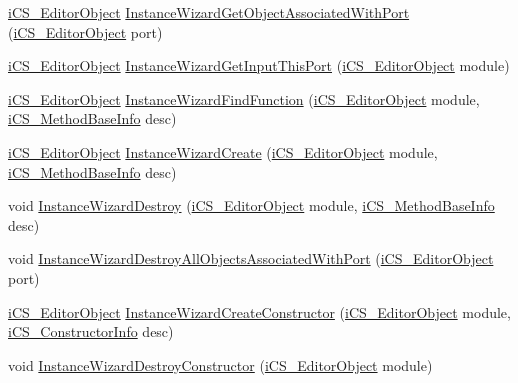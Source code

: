 \begin{DoxyCompactItemize}
\item 
\hyperlink{classi_c_s___editor_object}{i\+C\+S\+\_\+\+Editor\+Object} \hyperlink{classi_c_s___i_storage_a312bb4fcebd901bf72e88cab2eda09ed}{Instance\+Wizard\+Get\+Object\+Associated\+With\+Port} (\hyperlink{classi_c_s___editor_object}{i\+C\+S\+\_\+\+Editor\+Object} port)
\item 
\hyperlink{classi_c_s___editor_object}{i\+C\+S\+\_\+\+Editor\+Object} \hyperlink{classi_c_s___i_storage_ac989a06a1be5c74d555929c39562c487}{Instance\+Wizard\+Get\+Input\+This\+Port} (\hyperlink{classi_c_s___editor_object}{i\+C\+S\+\_\+\+Editor\+Object} module)
\item 
\hyperlink{classi_c_s___editor_object}{i\+C\+S\+\_\+\+Editor\+Object} \hyperlink{classi_c_s___i_storage_a1ae2ae5665e12de8a30ff1ed566fba17}{Instance\+Wizard\+Find\+Function} (\hyperlink{classi_c_s___editor_object}{i\+C\+S\+\_\+\+Editor\+Object} module, \hyperlink{classi_c_s___method_base_info}{i\+C\+S\+\_\+\+Method\+Base\+Info} desc)
\item 
\hyperlink{classi_c_s___editor_object}{i\+C\+S\+\_\+\+Editor\+Object} \hyperlink{classi_c_s___i_storage_a82823b45a1b32aad28a93af77bf6bfde}{Instance\+Wizard\+Create} (\hyperlink{classi_c_s___editor_object}{i\+C\+S\+\_\+\+Editor\+Object} module, \hyperlink{classi_c_s___method_base_info}{i\+C\+S\+\_\+\+Method\+Base\+Info} desc)
\item 
void \hyperlink{classi_c_s___i_storage_a28ea9bf635b85ffeb89a7802a289b1b9}{Instance\+Wizard\+Destroy} (\hyperlink{classi_c_s___editor_object}{i\+C\+S\+\_\+\+Editor\+Object} module, \hyperlink{classi_c_s___method_base_info}{i\+C\+S\+\_\+\+Method\+Base\+Info} desc)
\item 
void \hyperlink{classi_c_s___i_storage_a65c889516d836811e506ea072ab7eb5f}{Instance\+Wizard\+Destroy\+All\+Objects\+Associated\+With\+Port} (\hyperlink{classi_c_s___editor_object}{i\+C\+S\+\_\+\+Editor\+Object} port)
\item 
\hyperlink{classi_c_s___editor_object}{i\+C\+S\+\_\+\+Editor\+Object} \hyperlink{classi_c_s___i_storage_a52e42c40419938016610c2c05cab68e0}{Instance\+Wizard\+Create\+Constructor} (\hyperlink{classi_c_s___editor_object}{i\+C\+S\+\_\+\+Editor\+Object} module, \hyperlink{classi_c_s___constructor_info}{i\+C\+S\+\_\+\+Constructor\+Info} desc)
\item 
void \hyperlink{classi_c_s___i_storage_aa7e3006992fd5c1f8911a78278a6bcac}{Instance\+Wizard\+Destroy\+Constructor} (\hyperlink{classi_c_s___editor_object}{i\+C\+S\+\_\+\+Editor\+Object} module)
\item 

\end{DoxyCompactItemize}
